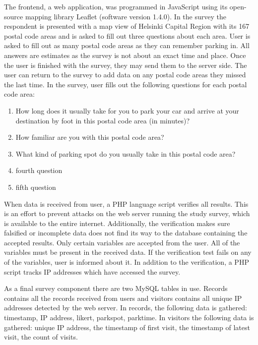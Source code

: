The frontend, a web application, was programmed in JavaScript using its open-source mapping library Leaflet (software version 1.4.0). In the survey the respondent is presented with a map view of Helsinki Capital Region with its 167 postal code areas and is asked to fill out three questions about each area. User is asked to fill out as many postal code areas as they can remember parking in. All answers are estimates as the survey is not about an exact time and place. Once the user is finished with the survey, they may send them to the server side. The user can return to the survey to add data on any postal code areas they missed the last time. In the survey, user fills out the following questions for each postal code area:

\begin{spacing}{1}
\begin{enumerate}
  \item How long does it usually take for you to park your car and arrive at your destination by foot in this postal code area (in minutes)?
  \item How familiar are you with this postal code area?
  \item What kind of parking spot do you usually take in this postal code area?
  \item fourth question
  \item fifth question
\end{enumerate}
\end{spacing}

\noindent
When data is received from user, a PHP language script verifies all results. This is an effort to prevent attacks on the web server running the study survey, which is available to the entire internet. Additionally, the verification makes sure falsified or incomplete data does not find its way to the database containing the accepted results. Only certain variables are accepted from the user. All of the variables must be present in the received data. If the verification test fails on any of the variables, user is informed about it. In addition to the verification, a PHP script tracks IP addresses which have accessed the survey.

As a final survey component there are two MySQL tables in use. Records contains all the records received from users and visitors contains all unique IP addresses detected by the web server. In records, the following data is gathered: timestamp, IP address, likert, parkspot, parktime. In visitors the following data is gathered: unique IP address, the timestamp of first visit, the timestamp of latest visit, the count of visits.

